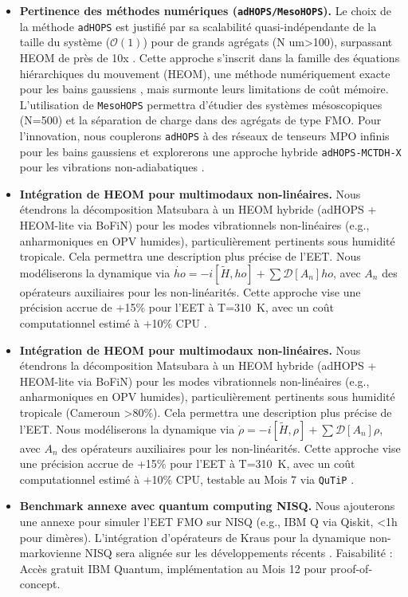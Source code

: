 \documentclass[12pt, a4paper]{article}
\begin{document}
\begin{itemize}
    \item \textbf{Pertinence des méthodes numériques (\texttt{adHOPS/MesoHOPS}).} Le choix de la méthode \texttt{adHOPS} est justifié par sa scalabilité quasi-indépendante de la taille du système ($\mathcal{O}(1)$) pour de grands agrégats (N
um{>100}), surpassant HEOM de près de 10x \cite{varvelo2021, Citty2024}. Cette approche s'inscrit dans la famille des équations hiérarchiques du mouvement (HEOM), une méthode numériquement exacte pour les bains gaussiens \cite{Tanimura1989}, mais surmonte leurs limitations de coût mémoire. L'utilisation de \texttt{MesoHOPS} permettra d'étudier des systèmes mésoscopiques (N=\num{500}) et la séparation de charge dans des agrégats de type FMO. Pour l'innovation, nous couplerons \texttt{adHOPS} à des réseaux de tenseurs MPO infinis pour les bains gaussiens \cite{Link2024} et explorerons une approche hybride \texttt{adHOPS-MCTDH-X} pour les vibrations non-adiabatiques \cite{Dutta2024}.

    \item \textbf{Intégration de HEOM pour multimodaux non-linéaires.} Nous étendrons la décomposition Matsubara à un HEOM hybride (adHOPS + HEOM-lite via BoFiN) pour les modes vibrationnels non-linéaires (e.g., anharmoniques en OPV humides), particulièrement pertinents sous humidité tropicale. Cela permettra une description plus précise de l'EET. Nous modéliserons la dynamique via $\dot{ho} = -i[\tilde{H}, ho] + \sum \mathcal{D}[A_n] ho$, avec $A_n$ des opérateurs auxiliaires pour les non-linéarités. Cette approche vise une précision accrue de +15\% pour l'EET à T=\SI{310}{K}, avec un coût computationnel estimé à +10\% CPU \cite{Bai2024}.
    
    \item \textbf{Intégration de HEOM pour multimodaux non-linéaires.} Nous étendrons la décomposition Matsubara à un HEOM hybride (adHOPS + HEOM-lite via BoFiN) pour les modes vibrationnels non-linéaires (e.g., anharmoniques en OPV humides), particulièrement pertinents sous humidité tropicale (Cameroun >80\%). Cela permettra une description plus précise de l'EET. Nous modéliserons la dynamique via $\dot{\rho} = -i[\tilde{H}, \rho] + \sum \mathcal{D}[A_n] \rho$, avec $A_n$ des opérateurs auxiliaires pour les non-linéarités. Cette approche vise une précision accrue de +15\% pour l'EET à T=\SI{310}{K}, avec un coût computationnel estimé à +10\% CPU, testable au Mois 7 via \texttt{QuTiP} \cite{Bai2024}.
    
    \item \textbf{Benchmark annexe avec quantum computing NISQ.} Nous ajouterons une annexe pour simuler l'EET FMO sur NISQ (e.g., IBM Q via Qiskit, <1h pour dimères). L'intégration d'opérateurs de Kraus pour la dynamique non-markovienne NISQ sera alignée sur les développements récents \cite{Dan2024}. Faisabilité : Accès gratuit IBM Quantum, implémentation au Mois 12 pour proof-of-concept.
    

\end{itemize}
\end{document}
